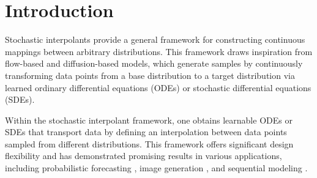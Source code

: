 
\section{Introduction}


Stochastic interpolants \cite{flows, interpolation} provide a general framework for constructing continuous mappings between arbitrary distributions. This framework draws inspiration from flow-based and diffusion-based models, which generate samples by continuously transforming data points from a base distribution to a target distribution via learned ordinary differential equations (ODEs) or stochastic differential equations (SDEs).

Within the stochastic interpolant framework, one obtains learnable ODEs or SDEs that transport data by defining an interpolation between data points sampled from different distributions. %
This framework offers significant design flexibility and has demonstrated promising results in various applications, including probabilistic forecasting \cite{chen2024forcasting}, image generation \cite{ma2024sitexploringflowdiffusionbased, albergo2024coupling}, and sequential modeling \cite{chen2024recurrent}.

